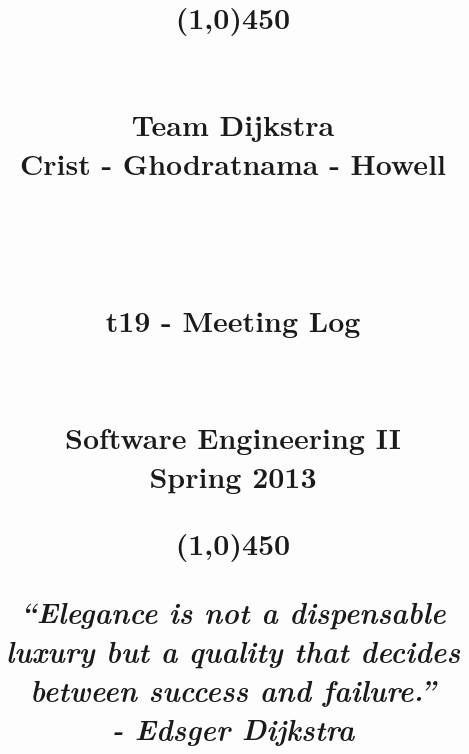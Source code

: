 \documentclass[11pt, letterpaper]{report}
\begin{document}
\title{\begin{center}
\line(1,0){450}
\end{center} \hfill \\ \Huge{Team Dijkstra }\\ \small{Crist - Ghodratnama - Howell } \\ \hfill \\ \hfill \\ \hfill \\ \huge{t19 - Meeting Log}  \\ \hfill \\ \hfill  \\ \Large{Software Engineering II} \\ \small{Spring 2013} \\ \begin{center}
\line(1,0){450}
\end{center}\small{\textit{``Elegance is not a dispensable luxury but a quality that decides between success and failure.'' \\- Edsger Dijkstra}}}
\date{ }

\maketitle
\newpage
\end{document}
